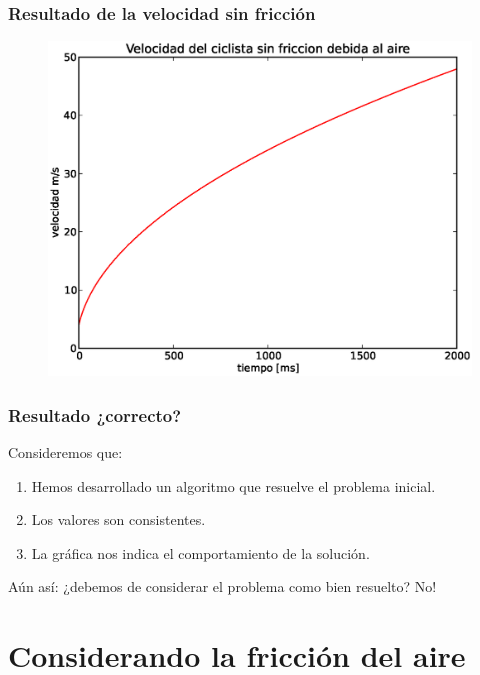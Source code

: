 \documentclass[12pt]{beamer}
\begin{document}
\begin{frame}
\frametitle{Resultado de la velocidad sin fricción}
\begin{figure}[H]
	\centering
	\includegraphics[scale=0.475]{Imagenes/EjerBicicleta01.eps}
\end{figure}
\end{frame}
\begin{frame}
\frametitle{Resultado ¿correcto?}
Consideremos que:
\begin{enumerate}[<+->]
\item Hemos desarrollado un algoritmo que resuelve el problema inicial.
\item Los valores son consistentes.
\item La gráfica nos indica el comportamiento de la solución.
\end{enumerate}
\pause
Aún así: ¿debemos de considerar el problema como bien resuelto? \pause \textcolor{auburn}{No!}
\end{frame}

\section*{Considerando la fricción del aire}
\end{document}
